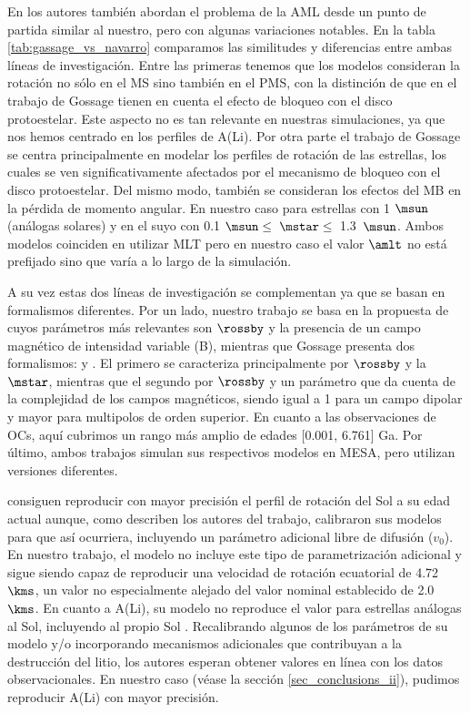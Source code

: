 En \cite{Gossage2021} los autores también abordan el problema de la AML desde un punto de partida similar al nuestro, pero con algunas variaciones notables. En la tabla \ref{tab:gassage_vs_navarro} comparamos las similitudes y diferencias entre ambas líneas de investigación. Entre las primeras tenemos que los modelos consideran la rotación no sólo en el MS sino también en el PMS, con la distinción de que en el trabajo de Gossage tienen en cuenta el efecto de bloqueo con el disco protoestelar. Este aspecto no es tan relevante en nuestras simulaciones, ya que nos hemos centrado en los perfiles de A(Li). Por otra parte el trabajo de Gossage se centra principalmente en modelar los perfiles de rotación de las estrellas, los cuales se ven significativamente afectados por el mecanismo de bloqueo con el disco protoestelar. Del mismo modo, también se consideran los efectos del MB en la pérdida de momento angular. En nuestro caso para estrellas con 1 $\msun$ (análogas solares) y en el suyo con 0.1 $\msun \le$\, $\mstar \le$\, 1.3 \,$\msun$. Ambos modelos coinciden en utilizar MLT pero en nuestro caso el valor $\amlt$ no está prefijado sino que varía a lo largo de la simulación.\par

A su vez estas dos líneas de investigación se complementan ya que se basan en formalismos diferentes. Por un lado, nuestro trabajo se basa en la propuesta de \cite{Gallet2013} cuyos parámetros más relevantes son $\rossby$ y la presencia de un campo magnético de intensidad variable (B), mientras que Gossage presenta dos formalismos: \cite{Matt2015} y \cite{Garraffo2018}. El primero se caracteriza principalmente por $\rossby$ y la $\mstar$, mientras que el segundo por $\rossby$ y un parámetro que da cuenta de la complejidad de los campos magnéticos, siendo igual a 1 para un campo dipolar y mayor para multipolos de orden superior. En cuanto a las observaciones de OCs, aquí cubrimos un rango más amplio de edades [0.001, 6.761] Ga. Por último, ambos trabajos simulan sus respectivos modelos en MESA, pero utilizan versiones diferentes.\par

\cite{Gossage2021} consiguen reproducir con mayor precisión el perfil de rotación del Sol a su edad actual \cite[ver][panel (a) de las figuras 2, 4 \& 6]{Gossage2021} aunque, como describen los autores del trabajo, calibraron sus modelos para que así ocurriera, incluyendo un parámetro adicional libre de difusión ($v_0$). En nuestro trabajo, el modelo no incluye este tipo de parametrización adicional y sigue siendo capaz de reproducir una velocidad de rotación ecuatorial de 4.72 $\kms$, un valor no especialmente alejado del valor nominal establecido de 2.0 $\kms$. En cuanto a A(Li), su modelo no reproduce el valor para estrellas análogas al Sol, incluyendo al propio Sol \cite[ver][panel (d) de las figuras 2 \& 4, y (b) de la figura 6]{Gossage2021}. Recalibrando algunos de los parámetros de su modelo y/o incorporando mecanismos adicionales que contribuyan a la destrucción del litio, los autores esperan obtener valores en línea con los datos observacionales. En nuestro caso (véase la sección \ref{sec_conclusions_ii}), pudimos reproducir A(Li) con mayor precisión.


